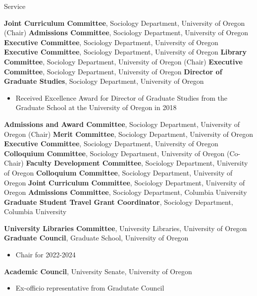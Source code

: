 \begin{rubric}{Service}



\entry*[2020 -- ] \textbf{Joint Curriculum Committee}, Sociology Department, University of Oregon (Chair) 
\entry*[2025 -- ] \textbf{Admissions Committee}, Sociology Department, University of Oregon  
\entry*[2025 -- 2027] \textbf{Executive Committee}, Sociology Department, University of Oregon  
\entry*[2022 -- 2023] \textbf{Executive Committee}, Sociology Department, University of Oregon  
\entry*[2021 -- 2022] \textbf{Library Committee}, Sociology Department, University of Oregon (Chair) 
\entry*[2020 -- 2021] \textbf{Executive Committee}, Sociology Department, University of Oregon  
\entry*[2014 -- 2020] \textbf{Director of Graduate Studies}, Sociology Department, University of Oregon  \begin{itemize}
\item Received Excellence Award for Director of Graduate Studies from the Graduate School at the University of Oregon in 2018

\end{itemize}
\entry*[2014 -- 2020] \textbf{Admissions and Award Committee}, Sociology Department, University of Oregon (Chair) 
\entry*[2017 -- 2018] \textbf{Merit Committee}, Sociology Department, University of Oregon  
\entry*[2016 -- 2017] \textbf{Executive Committee}, Sociology Department, University of Oregon  
\entry*[2012 -- 2014] \textbf{Colloquium Committee}, Sociology Department, University of Oregon (Co-Chair) 
\entry*[2011 -- 2013] \textbf{Faculty Development Committee}, Sociology Department, University of Oregon  
\entry*[2008 -- 2010] \textbf{Colloquium Committee}, Sociology Department, University of Oregon  
\entry*[2007 -- 2008] \textbf{Joint Curriculum Committee}, Sociology Department, University of Oregon  
\entry*[2006 -- 2007] \textbf{Admissions Committee}, Sociology Department, Columbia University  
\entry*[2004 -- 2007] \textbf{Graduate Student Travel Grant Coordinator}, Sociology Department, Columbia University  


\entry*[2021 -- 2023] \textbf{University Libraries Committee}, University Libraries, University of Oregon  
\entry*[2021 -- 2024] \textbf{Graduate Council}, Graduate School, University of Oregon  \begin{itemize}
\item Chair for 2022-2024

\end{itemize}
\entry*[2022 -- 2024] \textbf{Academic Council}, University Senate, University of Oregon  \begin{itemize}
\item Ex-officio representative from Gradutate Council


\end{itemize}
\end{rubric}
